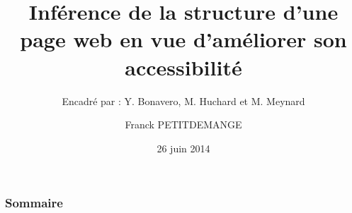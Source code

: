 \documentclass[9pt]{beamer}
\begin{document}
\title[Inférence de la structure d'une page web]{Inférence de la structure d'une page web en vue d'améliorer son accessibilité}
\subtitle[\ldots]{Encadré par : Y. Bonavero, M. Huchard et M. Meynard}
\author[Franck PETITDEMANGE]{Franck PETITDEMANGE}
\date{26 juin 2014}




\begin{frame}
\titlepage
\end{frame}

\begin{frame}
  \frametitle{Sommaire}
  \tableofcontents[hideothersubsections]
\end{frame}
\end{document}
